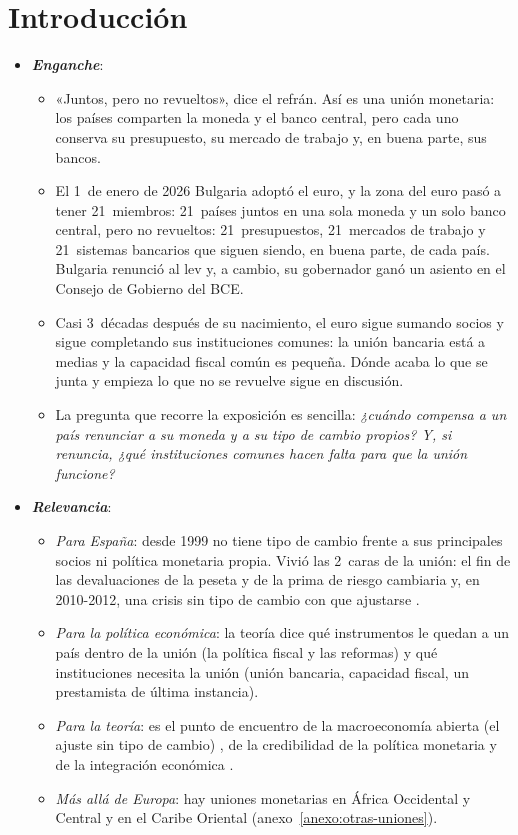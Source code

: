 \documentclass[11pt]{article}
\begin{document}
\tceetitulo

\section*{Introducción}

\begin{itemize}
\item \textbf{\emph{Enganche}}:
  \begin{itemize}
  \item «Juntos, pero no revueltos», dice el refrán. Así es una unión monetaria: los países comparten la moneda y el banco central, pero cada uno conserva su presupuesto, su mercado de trabajo y, en buena parte, sus bancos.
  \item El 1~de enero de 2026 Bulgaria adoptó el euro, y la zona del euro pasó a tener 21~miembros\nocite{BCE2026Bulgaria,CE2026PaisesEuro}: 21~países juntos en una sola moneda y un solo banco central, pero no revueltos: 21~presupuestos, 21~mercados de trabajo y 21~sistemas bancarios que siguen siendo, en buena parte, de cada país. Bulgaria renunció al lev y, a cambio, su gobernador ganó un asiento en el Consejo de Gobierno del BCE.
  \item Casi 3~décadas después de su nacimiento, el euro sigue sumando socios y sigue completando sus instituciones comunes: la unión bancaria está a medias y la capacidad fiscal común es pequeña. Dónde acaba lo que se junta y empieza lo que no se revuelve sigue en discusión.
  \item La pregunta que recorre la exposición es sencilla: \emph{¿cuándo compensa a un país renunciar a su moneda y a su tipo de cambio propios? Y, si renuncia, ¿qué instituciones comunes hacen falta para que la unión funcione?}
  \end{itemize}

\item \textbf{\emph{Relevancia}}:
  \begin{itemize}
  \item \emph{Para España}: desde 1999 no tiene tipo de cambio frente a sus principales socios ni política monetaria propia\nocite{CE2026PaisesEuro}. Vivió las 2~caras de la unión: el fin de las devaluaciones de la peseta y de la prima de riesgo cambiaria y, en 2010-2012, una crisis sin tipo de cambio con que ajustarse .
  \item \emph{Para la política económica}: la teoría dice qué instrumentos le quedan a un país dentro de la unión (la política fiscal y las reformas) y qué instituciones necesita la unión (unión bancaria, capacidad fiscal, un prestamista de última instancia).
  \item \emph{Para la teoría}: es el punto de encuentro de la macroeconomía abierta (el ajuste sin tipo de cambio) , de la credibilidad de la política monetaria  y de la integración económica .
  \item \emph{Más allá de Europa}: hay uniones monetarias en África Occidental y Central y en el Caribe Oriental (anexo~\ref{anexo:otras-uniones}).
  \end{itemize}


\end{itemize}
\end{document}
